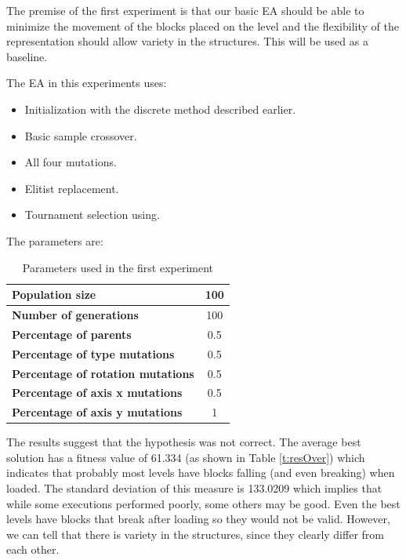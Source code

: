 \documentclass[sigconf]{acmart}
\newcommand{\myfloatalign}{\centering} %
\begin{document}
The premise of the first experiment is that our basic EA should be able to 
minimize the movement of the blocks placed on the level and the flexibility of 
the representation should allow variety in the structures. This will
be used as a baseline.

The EA in this experiments uses:
\begin{itemize}
	\item  Initialization with the discrete method described earlier.
	\item  Basic sample crossover.
	\item  All four mutations.
	\item  Elitist replacement.
	\item  Tournament selection using.
\end{itemize}

The parameters are: %

\begin{table}[H]
	\myfloatalign
	\caption{Parameters used in the first experiment} 
	\label{t:base}
	\begin{tabular}{lc}
		\hline
		\textbf{Population size} & 100 \\ \hline
		\textbf{Number of generations} & 100 \\  \hline
		\textbf{Percentage of parents} &  0.5 \\  \hline
		\textbf{Percentage of type mutations} & 0.5 \\  \hline
		\textbf{Percentage of rotation mutations} & 0.5 \\  \hline
		\textbf{Percentage of axis x mutations}  & 0.5 \\  \hline
		\textbf{Percentage of axis y mutations}  & 1 \\  \hline
	\end{tabular}
\end{table}

The results suggest that the hypothesis was not correct. The average best 
solution has a fitness value of 61.334 (as shown in Table \ref{t:resOver}) 
which indicates that probably most levels have blocks falling (and even 
breaking) when loaded. The standard deviation of this measure is 133.0209 which 
implies that while some executions performed poorly, some others may be good. 
Even the best levels have blocks that break after loading so they would not be 
valid. However, we can tell that there is variety in the structures, since they 
clearly differ from each other. 
\end{document}
